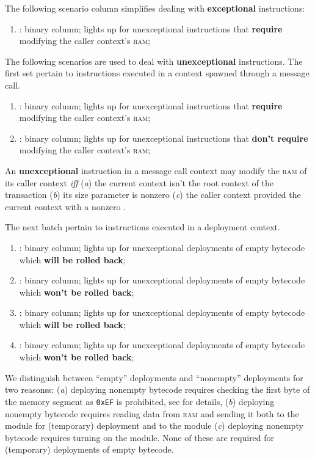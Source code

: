 The following scenario column simplifies dealing with \textbf{exceptional}  instructions: 
\begin{enumerate}[resume]
	\item \scenReturnException:
		binary column;
		lights up for unexceptional  instructions that \textbf{require} modifying the caller context's \textsc{ram};
\end{enumerate}
The following scenarios are used to deal with \textbf{unexceptional}  instructions.
The first set pertain to  instructions executed in a context spawned through a message call.
\begin{enumerate}[resume]
	\item \scenReturnFromMessageCallWillTouchRam:
		binary column;
		lights up for unexceptional  instructions that \textbf{require} modifying the caller context's \textsc{ram};
	\item \scenReturnFromMessageCallWontTouchRam:
		binary column;
		lights up for unexceptional  instructions that \textbf{don't require} modifying the caller context's \textsc{ram};
\end{enumerate}
\saNote{} An \textbf{unexceptional}  instruction in a message call context may modify the \textsc{ram} of its caller context \emph{iff}
(\emph{a}) the current context isn't the root context of the transaction
(\emph{b}) its size parameter is nonzero
(\emph{c}) the caller context provided the current context with a nonzero \rac{}.

The next batch pertain to  instructions executed in a deployment context.
\begin{enumerate}[resume]
	\item \scenReturnFromDeploymentEmptyByteCodeWillRevert:
		binary column;
		lights up for unexceptional  deployments of empty bytecode which \textbf{will be rolled back};
	\item \scenReturnFromDeploymentEmptyByteCodeWontRevert:
		binary column;
		lights up for unexceptional  deployments of empty bytecode which \textbf{won't be rolled back};
	\item \scenReturnFromDeploymentNonemptyByteCodeWillRevert:
		binary column;
		lights up for unexceptional  deployments of empty bytecode which \textbf{will be rolled back};
	\item \scenReturnFromDeploymentNonemptyByteCodeWontRevert:
		binary column;
		lights up for unexceptional  deployments of empty bytecode which \textbf{won't be rolled back};
\end{enumerate}
\saNote{} We distinguish between ``empty'' deployments and ``nonempty'' deployments for two reasonss:
(\emph{a}) deploying nonempty bytecode requires checking the first byte of the memory segment as \texttt{0xEF} is prohibited, see \cite{EIP-3541} for details,
(\emph{b}) deploying nonempty bytecode requires reading data from \textsc{ram} and sending it both to the \romMod{} module for (temporary) deployment and to the \hashDataMod{} module
(\emph{c}) deploying nonempty bytecode requires turning on the \hashInfoMod{} module.
None of these are required for (temporary) deployments of empty bytecode.
